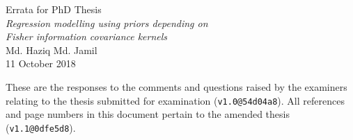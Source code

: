 \documentclass[11pt,openright,twoside]{report}
\begin{document}
\pagestyle{chaptererr}

\begin{center}
  {\Large Errata for PhD Thesis} \\[0.5em]
  \textit{\large Regression modelling using priors depending on} \\[-0.2em]
  \textit{\large Fisher information covariance kernels} \\[0.5em]
  {\large Md. Haziq Md. Jamil} \\
  {\large 11 October 2018}
\end{center}

\vspace{2em}

These are the responses to the comments and questions raised by the examiners relating to the thesis submitted for examination (\verb|v1.0@54d04a8|).
All references and page numbers in this document pertain to the amended thesis (\verb|v1.1@0dfe5d8|).
\end{document}
